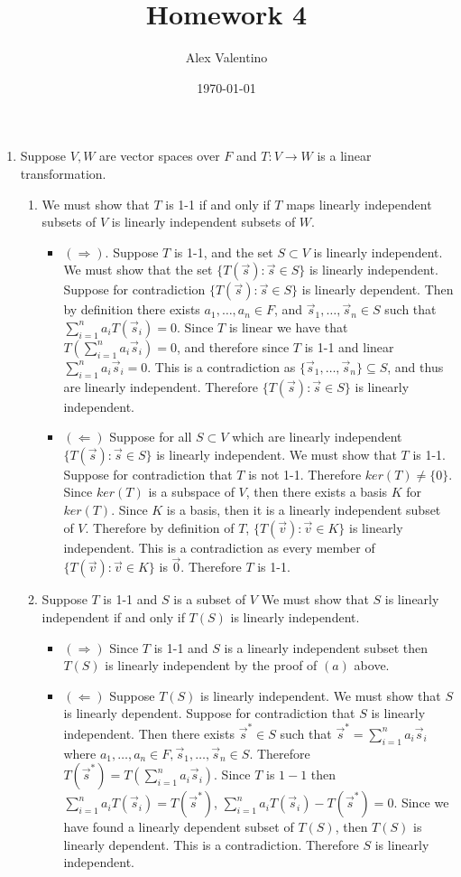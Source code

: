 \documentclass[12pt, letterpaper]{article}
\date{\today}
\author{Alex Valentino}
\title{Homework 4}
\begin{document}
\begin{enumerate}
	\item Suppose $V,W$ are vector spaces over $F$ and $T : V \to W$ is a linear transformation.
	\begin{enumerate}
		\item   We must show that $T$ is 1-1 if and only if $T$ maps linearly independent subsets of $V$ is linearly independent subsets of $W$.  
		\begin{itemize}
			\item $(\Rightarrow)$.  Suppose $T$ is 1-1, and the set $S \subset V$ is linearly independent.  We must show that the set $\{T(\Vec{s}): \Vec{s} \in S\}$ is linearly independent.  Suppose for contradiction $\{T(\Vec{s}): \Vec{s} \in S\}$ is linearly dependent.  Then by definition there exists $a_1,\ldots,a_n \in F$, and $\Vec{s}_1,\ldots,\Vec{s}_n \in S$ such that $\sum_{i=1}^n a_i T(\Vec{s}_i) = 0$.  Since $T$ is linear we have that $T(\sum_{i=1}^n a_i \Vec{s}_i) = 0$, and therefore since $T$ is 1-1 and linear $\sum_{i=1}^n a_i \Vec{s}_i = 0$.  This is a contradiction as $\{ \Vec{s}_1,\ldots, \Vec{s}_n \} \subseteq S$, and thus are linearly independent.  Therefore $\{T( \Vec{s}):  \Vec{s} \in S\}$ is linearly independent.  
			\item $(\Leftarrow)$ Suppose for all $S \subset V$ which are linearly independent $\{T( \Vec{s}) :  \Vec{s} \in S\}$ is linearly independent.  We must show that $T$ is 1-1.  Suppose for contradiction that $T$ is not 1-1.  Therefore $ker(T)  \neq \{0\}$.  Since $ker(T)$ is a subspace of $V$, then there exists a basis $K$ for $ker(T)$.  Since $K$ is a basis, then it is a linearly independent subset of $V$.  Therefore by definition of $T$, $\{T(\Vec{v}):\Vec{v} \in K\}$ is linearly independent.  This is a contradiction as every member of $\{T(\Vec{v}):\Vec{v} \in K\}$  is $\Vec{0}$.  Therefore $T$ is 1-1.  
		\end{itemize}
		\item Suppose $T$ is 1-1 and $S$ is a subset of $V$ We must show that $S$ is linearly independent if and only if $T(S)$ is linearly independent.  
		\begin{itemize}
			\item $(\Rightarrow)$ Since $T$ is 1-1 and $S$ is a linearly independent subset then $T(S)$ is linearly independent by the proof of $(a)$ above.  
			\item $(\Leftarrow)$ Suppose $T(S)$ is linearly independent.  We must show that $S$ is linearly dependent.  Suppose for contradiction that $S$ is linearly independent.  Then there exists $\Vec{s}^* \in S$ such that $\Vec{s}^* = \sum_{i=1}^n a_i \Vec{s}_i$ where $a_1,\ldots,a_n \in F, \Vec{s}_1,\ldots,\Vec{s}_n \in S$.  Therefore $T(\Vec{s}^*) = T(\sum_{i=1}^n a_i \Vec{s}_i)$. Since $T$ is $1-1$ then $\sum_{i=1}^n a_i T(\Vec{s}_i) = T(\Vec{s}^*)$, $\sum_{i=1}^n a_i T(\Vec{s}_i) - T(\Vec{s}^*) = 0$.  Since we have found a linearly dependent subset of $T(S)$, then $T(S)$ is linearly dependent.  This is a contradiction.  Therefore $S$ is linearly independent.  

\end{itemize}
\end{enumerate}
\end{enumerate}
\end{document}
